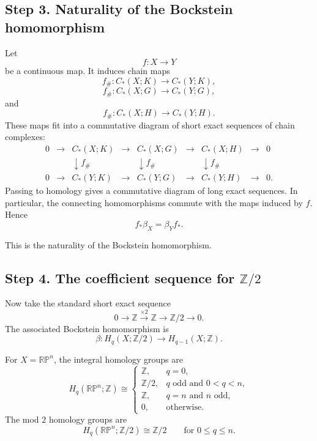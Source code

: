 \documentclass[12pt,a4paper]{article}
\theoremstyle{notespace}
\begin{document}
\subsection*{Step 3. Naturality of the Bockstein homomorphism}

Let
\[
f:X\longrightarrow Y
\]
be a continuous map. It induces chain maps
\[
f_\#:C_*(X;K)\longrightarrow C_*(Y;K),
\]
\[
f_\#:C_*(X;G)\longrightarrow C_*(Y;G),
\]
and
\[
f_\#:C_*(X;H)\longrightarrow C_*(Y;H).
\]
These maps fit into a commutative diagram of short exact sequences of chain complexes:
\[
\begin{array}{ccccccccc}
	0 &\longrightarrow& C_*(X;K) &\longrightarrow& C_*(X;G) &\longrightarrow& C_*(X;H) &\longrightarrow& 0 \\[1mm]
	&& \downarrow f_\# && \downarrow f_\# && \downarrow f_\# && \\[1mm]
	0 &\longrightarrow& C_*(Y;K) &\longrightarrow& C_*(Y;G) &\longrightarrow& C_*(Y;H) &\longrightarrow& 0 .
\end{array}
\]
Passing to homology gives a commutative diagram of long exact sequences. In particular, the connecting homomorphisms commute with the maps induced by \(f\). Hence
\[
\boxed{
	f_*\beta_X=\beta_Y f_*.
}
\]

This is the naturality of the Bockstein homomorphism.

\subsection*{Step 4. The coefficient sequence for \(\mathbb{Z}/2\)}

Now take the standard short exact sequence
\[
0\longrightarrow \mathbb Z
\xrightarrow{\times 2}
\mathbb Z
\longrightarrow
\mathbb Z/2
\longrightarrow 0.
\]
The associated Bockstein homomorphism is
\[
\beta:
H_q(X;\mathbb Z/2)
\longrightarrow
H_{q-1}(X;\mathbb Z).
\]

For \(X=\mathbb{RP}^n\), the integral homology groups are
\[
H_q(\mathbb{RP}^n;\mathbb Z)
\cong
\begin{cases}
	\mathbb Z, & q=0,\\[1mm]
	\mathbb Z/2, & q \text{ odd and } 0<q<n,\\[1mm]
	\mathbb Z, & q=n \text{ and } n \text{ odd},\\[1mm]
	0, & \text{otherwise}.
\end{cases}
\]
The mod \(2\) homology groups are
\[
H_q(\mathbb{RP}^n;\mathbb Z/2)
\cong
\mathbb Z/2
\qquad
\text{for }0\le q\le n.
\]
\end{document}
